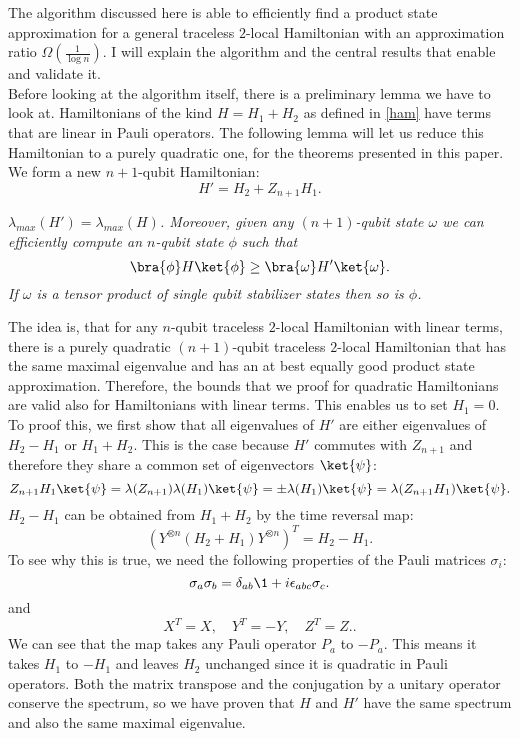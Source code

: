 The algorithm discussed here is able to efficiently find a product state approximation for a general traceless $2$-local Hamiltonian with an approximation ratio $\Omega(\frac{1}{\log n})$\cite{bravyi19}.
I will explain the algorithm and the central results that enable and validate it.\\
Before looking at the algorithm itself, there is a preliminary lemma we have to look at.
Hamiltonians of the kind $H = H_1+H_2$ as defined in \eqref{ham} have terms that are linear in Pauli operators.
The following lemma will let us reduce this Hamiltonian to a purely quadratic one, for the theorems presented in this paper.
We form a new $n+1$-qubit Hamiltonian: \[
H'=H_2+Z_{n+1}H_1
.\]

\begin{lma}
	\emph{$\lambda_{max}\left( H' \right) =\lambda_{max}\left( H \right)$. Moreover, given any $(n+1)$-qubit state  $\omega$ we can efficiently compute an $n$-qubit state $\phi$ such that \[
	\bra{\phi}H\ket{\phi} \ge \bra{\omega}H'\ket{\omega}
	.\]
If $\omega$ is a tensor product of single qubit stabilizer states then so is $\phi$.}
\end{lma}
The idea is, that for any $n$-qubit traceless $2$-local Hamiltonian with linear terms, there is a purely quadratic $(n+1)$-qubit traceless $2$-local Hamiltonian that has the same maximal eigenvalue and has an at best equally good product state approximation.
Therefore, the bounds that we proof for quadratic Hamiltonians are valid also for Hamiltonians with linear terms.
This enables us to set $H_1=0$.
To proof this, we first show that all eigenvalues of $H'$ are either eigenvalues of $H_2-H_1$ or $H_1+H_2$.
This is the case because $H'$ commutes with $Z_{n+1}$ and therefore they share a common set of eigenvectors $\ket{\psi}$: \[
Z_{n+1}H_1\ket{\psi} = \lambda(Z_{n+1})\lambda(H_1)\ket{\psi}=\pm \lambda(H_1)\ket{\psi} = \lambda(Z_{n+1}H_1)\ket{\psi}
.\]
$H_2-H_1$ can be obtained from $H_1+H_2$ by the time reversal map:
\[
	\left( Y^{\otimes n}\left( H_2+H_1 \right) Y^{\otimes n} \right) ^{T} = H_2-H_1
.\]
To see why this is true, we need the following properties of the Pauli matrices $\sigma_{i}$: \[
	\sigma_a\sigma_b=\delta_{ab}\1 + i\epsilon_{abc}\sigma_c
.\]
and \[
	X^{T}=X, \quad Y^{T}=-Y, \quad Z^{T}=Z.
.\]
We can see that the map takes any Pauli operator $P_a$ to $-P_a$.
This means it takes  $H_1$ to $-H_1$ and leaves $H_2$ unchanged since it is quadratic in Pauli operators.
Both the matrix transpose and the conjugation by a unitary operator conserve the spectrum, so we have proven that  $H$ and $H'$ have the same spectrum and also the same maximal eigenvalue.

